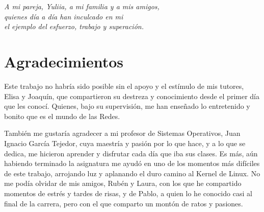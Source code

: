 

\cleardoublepage %
\chapter*{}
\setlength{\leftmargin}{0.5\textwidth}
\setlength{\parsep}{0cm}
\addtolength{\topsep}{0.5cm}
\begin{flushright}
\small\em{
A mi pareja, Yuliia, a mi familia y a mis amigos,\\
quienes día a día han inculcado en mi \\
el ejemplo del esfuerzo, trabajo y superación.
}
\end{flushright}




\chapter*{Agradecimientos}

\thispagestyle{empty}
\vspace{1cm}

Este trabajo no habría sido posible sin el apoyo y el estímulo de mis tutores, Elisa y Joaquín, que compartieron su destreza y conocimiento desde el primer día que les conocí. Quienes, bajo su supervisión, me han enseñado lo entretenido y bonito que es el mundo de las Redes. \newline

También me gustaría agradecer a mi profesor de Sistemas Operativos, Juan Ignacio García Tejedor, cuya maestría y pasión por lo que hace, y a lo que se dedica, me hicieron aprender y disfrutar cada día que iba sus clases. Es más, aún habiendo terminado la asignatura me ayudó en uno de los momentos más difíciles de este trabajo, arrojando luz y aplanando el duro camino al Kernel de Linux. No me podía olvidar de mis amigos, Rubén y Laura, con los que he compartido momentos de estrés y tardes de risas, y de Pablo, a quien lo he conocido casi al final de la carrera, pero con el que comparto un montón de ratos y pasiones. \newline


